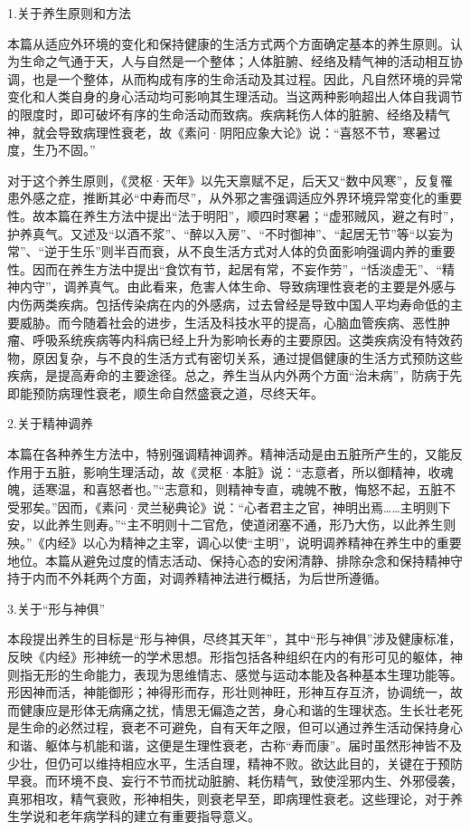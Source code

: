 \documentclass[draft,12pt]{ctexbook}
\begin{document}

1.关于养生原则和方法

本篇从适应外环境的变化和保持健康的生活方式两个方面确定基本的养生原则。认为生命之气通于天，人与自然是一个整体；人体脏腑、经络及精气神的活动相互协调，也是一个整体，从而构成有序的生命活动及其过程。因此，凡自然环境的异常变化和人类自身的身心活动均可影响其生理活动。当这两种影响超出人体自我调节的限度时，即可破坏有序的生命活动而致病。疾病耗伤人体的脏腑、经络及精气神，就会导致病理性衰老，故《素问·阴阳应象大论》说：“喜怒不节，寒暑过度，生乃不固。”

对于这个养生原则，《灵枢·天年》以先天禀赋不足，后天又“数中风寒”，反复罹患外感之症，推断其必“中寿而尽”，从外邪之害强调适应外界环境异常变化的重要性。故本篇在养生方法中提出“法于明阳”，顺四时寒暑；“虚邪贼风，避之有时”，护养真气。又述及“以酒不浆”、“醉以入房”、“不时御神”、“起居无节”等“以妄为常”、“逆于生乐”则半百而衰，从不良生活方式对人体的负面影响强调内养的重要性。因而在养生方法中提出“食饮有节，起居有常，不妄作劳”，“恬淡虚无”、“精神内守”，调养真气。由此看来，危害人体生命、导致病理性衰老的主要是外感与内伤两类疾病。包括传染病在内的外感病，过去曾经是导致中国人平均寿命低的主要威胁。而今随着社会的进步，生活及科技水平的提高，心脑血管疾病、恶性肿瘤、呼吸系统疾病等内科病已经上升为影响长寿的主要原因。这类疾病没有特效药物，原因复杂，与不良的生活方式有密切关系，通过提倡健康的生活方式预防这些疾病，是提高寿命的主要途径。总之，养生当从内外两个方面“治未病”，防病于先即能预防病理性衰老，顺生命自然盛衰之道，尽终天年。

2.关于精神调养

本篇在各种养生方法中，特别强调精神调养。精神活动是由五脏所产生的，又能反作用于五脏，影响生理活动，故《灵枢·本脏》说：“志意者，所以御精神，收魂魄，适寒温，和喜怒者也。”“志意和，则精神专直，魂魄不散，悔怒不起，五脏不受邪矣。”因而，《素问·灵兰秘典论》说：“心者君主之官，神明出焉……主明则下安，以此养生则寿。”“主不明则十二官危，使道闭塞不通，形乃大伤，以此养生则殃。”《内经》以心为精神之主宰，调心以使“主明”，说明调养精神在养生中的重要地位。本篇从避免过度的情志活动、保持心态的安闲清静、排除杂念和保持精神守持于内而不外耗两个方面，对调养精神法进行概括，为后世所遵循。

3.关于“形与神俱”

本段提出养生的目标是“形与神俱，尽终其天年”，其中“形与神俱”涉及健康标准，反映《内经》形神统一的学术思想。形指包括各种组织在内的有形可见的躯体，神则指无形的生命能力，表现为思维情志、感觉与运动本能及各种基本生理功能等。形因神而活，神能御形；神得形而存，形壮则神旺，形神互存互济，协调统一，故而健康应是形体无病痛之扰，情思无偏造之苦，身心和谐的生理状态。生长壮老死是生命的必然过程，衰老不可避免，自有天年之限，但可以通过养生活动保持身心和谐、躯体与机能和谐，这便是生理性衰老，古称“寿而康”。届时虽然形神皆不及少壮，但仍可以维持相应水平，生活自理，精神不败。欲达此目的，关键在于预防早衰。而环境不良、妄行不节而扰动脏腑、耗伤精气，致使淫邪内生、外邪侵袭，真邪相攻，精气衰败，形神相失，则衰老早至，即病理性衰老。这些理论，对于养生学说和老年病学科的建立有重要指导意义。
\end{document}
